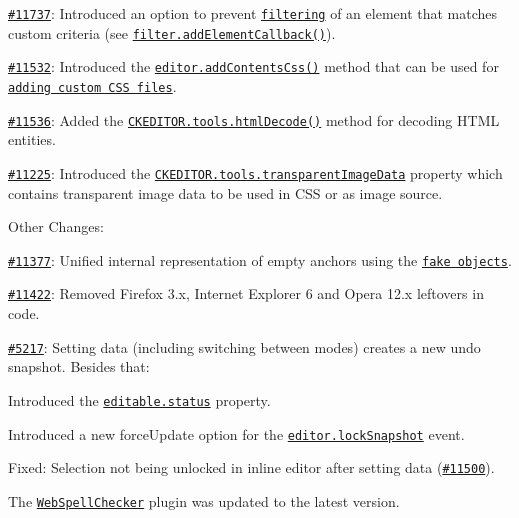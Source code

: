 \begin{DoxyItemize}
\item \href{http://dev.ckeditor.com/ticket/11737}{\tt \#11737}\+: Introduced an option to prevent \href{http://docs.ckeditor.com/#!/guide/dev_advanced_content_filter}{\tt filtering} of an element that matches custom criteria (see \href{http://docs.ckeditor.com/#!/api/CKEDITOR.filter-method-addElementCallback}{\tt {\ttfamily filter.\+add\+Element\+Callback()}}).
\item \href{http://dev.ckeditor.com/ticket/11532}{\tt \#11532}\+: Introduced the \href{http://docs.ckeditor.com/#!/api/CKEDITOR.editor-method-addContentsCss}{\tt {\ttfamily editor.\+add\+Contents\+Css()}} method that can be used for \href{http://docs.ckeditor.com/#!/guide/plugin_sdk_styles}{\tt adding custom C\+SS files}.
\item \href{http://dev.ckeditor.com/ticket/11536}{\tt \#11536}\+: Added the \href{http://docs.ckeditor.com/#!/api/CKEDITOR.tools-method-htmlDecode}{\tt {\ttfamily C\+K\+E\+D\+I\+T\+O\+R.\+tools.\+html\+Decode()}} method for decoding H\+T\+ML entities.
\item \href{http://dev.ckeditor.com/ticket/11225}{\tt \#11225}\+: Introduced the \href{http://docs.ckeditor.com/#!/api/CKEDITOR.tools-property-transparentImageData}{\tt {\ttfamily C\+K\+E\+D\+I\+T\+O\+R.\+tools.\+transparent\+Image\+Data}} property which contains transparent image data to be used in C\+SS or as image source.
\end{DoxyItemize}

Other Changes\+:


\begin{DoxyItemize}
\item \href{http://dev.ckeditor.com/ticket/11377}{\tt \#11377}\+: Unified internal representation of empty anchors using the \href{http://ckeditor.com/addon/fakeobjects}{\tt fake objects}.
\item \href{http://dev.ckeditor.com/ticket/11422}{\tt \#11422}\+: Removed Firefox 3.\+x, Internet Explorer 6 and Opera 12.\+x leftovers in code.
\item \href{http://dev.ckeditor.com/ticket/5217}{\tt \#5217}\+: Setting data (including switching between modes) creates a new undo snapshot. Besides that\+:
\begin{DoxyItemize}
\item Introduced the \href{http://docs.ckeditor.com/#!/api/CKEDITOR.editable-property-status}{\tt {\ttfamily editable.\+status}} property.
\item Introduced a new {\ttfamily force\+Update} option for the \href{http://docs.ckeditor.com/#!/api/CKEDITOR.editor-event-lockSnapshot}{\tt {\ttfamily editor.\+lock\+Snapshot}} event.
\item Fixed\+: Selection not being unlocked in inline editor after setting data (\href{http://dev.ckeditor.com/ticket/11500}{\tt \#11500}).
\end{DoxyItemize}
\item The \href{http://ckeditor.com/addon/wsc}{\tt Web\+Spell\+Checker} plugin was updated to the latest version.
\end{DoxyItemize}

